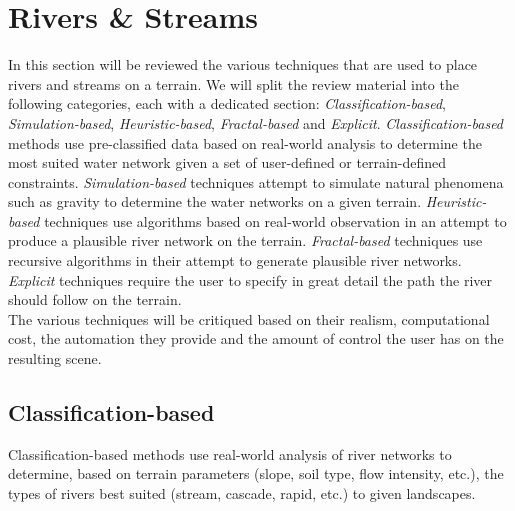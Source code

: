 \section{Rivers \& Streams}

In this section will be reviewed the various techniques that are used to place rivers and streams on a terrain. We will split the review material into the following categories, each with a dedicated section: \textit{Classification-based}, \textit{Simulation-based}, \textit{Heuristic-based}, \textit{Fractal-based} and \textit{Explicit}. \textit{Classification-based} methods use pre-classified data based on real-world analysis to determine the most suited water network given a set of user-defined or terrain-defined constraints. \textit{Simulation-based} techniques attempt to simulate natural phenomena such as gravity to determine the water networks on a given terrain. \textit{Heuristic-based} techniques use algorithms based on real-world observation in an attempt to produce a plausible river network on the terrain. \textit{Fractal-based} techniques use recursive algorithms in their attempt to generate plausible river networks. \textit{Explicit} techniques require the user to specify in great detail the path the river should follow on the terrain.\\

The various techniques will be critiqued based on their realism, computational cost, the automation they provide and the amount of control the user has on the resulting scene. 

\subsection{Classification-based}

Classification-based methods use real-world analysis of river networks to determine, based on terrain parameters (slope, soil type, flow intensity, etc.), the types of rivers best suited (stream, cascade, rapid, etc.) to given landscapes.\\

